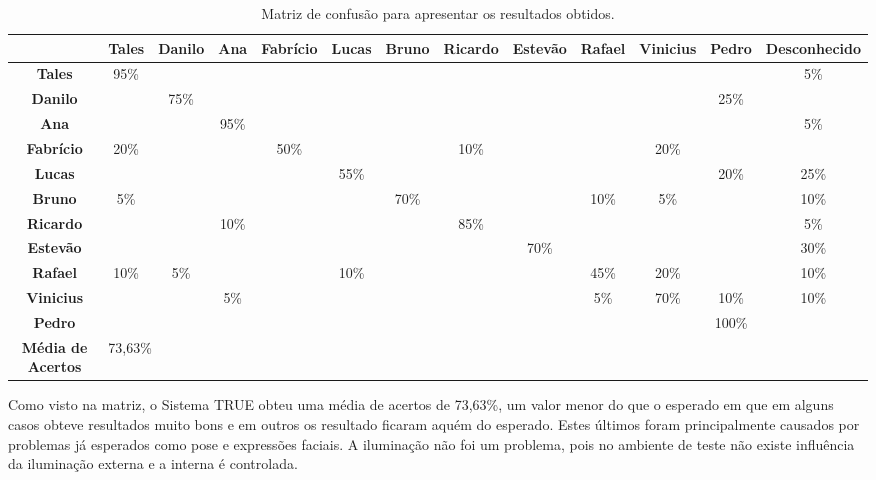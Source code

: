 	\begin{landscape}
	\begin{table}[H]
		\begin{center}
			\caption{Matriz de confusão para apresentar os resultados obtidos.}
			\label{tab:matriz-confusao}
			\begin{tabular}{|c|c|c|c|c|c|c|c|c|c|c|c|c|}
				\hline  & \bf Tales & \bf Danilo & \bf Ana & \bf Fabrício & \bf Lucas & \bf Bruno & \bf Ricardo & \bf Estevão & \bf Rafael & \bf Vinicius & \bf Pedro & \bf Desconhecido\\
				\hline \bf Tales 		& 95\% & 			& 		 & 			&   	 & 			& 		 & 			& 		 & 			& 		 & 5\%	\\
				\hline \bf Danilo 	& 		 & 75\% & 		 & 			&   	 & 			& 		 & 			& 		 & 			& 25\%  &		 	\\
				\hline \bf Ana 			& 		 & 			& 95\% & 			&   	 & 			& 		 & 			& 		 & 			& 		 & 5\%  \\
				\hline \bf Fabrício & 20\% & 			& 		 & 50\% &      & 			& 10\% & 			&  	   & 20\% & 		 &		  \\
				\hline \bf Lucas 		& 		 & 			& 		 & 			& 55\% & 			& 		 & 			& 		 & 			& 20\% & 25\% \\
				\hline \bf Bruno 		& 5\%	 & 			& 		 & 			& 		 & 70\% & 		 & 			& 10\% & 	5\%	& 		 & 10\%	\\
				\hline \bf Ricardo 	& 		 & 			& 10\% & 			& 		 & 			& 85\% & 			& 		 & 			& 		 & 5\%  \\
				\hline \bf Estevão 	& 		 & 			& 		 & 			& 		 & 			& 		 & 70\% & 		 & 			& 		 & 30\% \\
				\hline \bf Rafael 	& 10\% & 	5\%	& 		 & 			& 10\% & 			& 		 & 			& 45\% & 20\% & 		 & 10\% \\
				\hline \bf Vinicius & 		 & 			& 5\%  & 			& 		 & 			& 		 & 			& 5\%  & 70\% & 10\% & 10\% \\
				\hline \bf Pedro 		& 		 & 			& 		 & 			& 		 & 			& 		 & 			& 		 & 			& 100\%&		  \\
				\hline
				\hline \bf Média de Acertos & \multicolumn{12}{|l|}{73,63\%} \\
				\hline
			\end{tabular}
		\end{center}
	\end{table}
	\end{landscape}

	Como visto na matriz, o Sistema TRUE obteu uma média de acertos de 73,63\%, um valor menor do que o esperado em que em alguns casos obteve resultados muito bons e em outros os resultado ficaram aquém do esperado. Estes últimos foram principalmente causados por problemas já esperados como pose e expressões faciais. A iluminação não foi um problema, pois no ambiente de teste não existe influência da iluminação externa e a interna é controlada.
